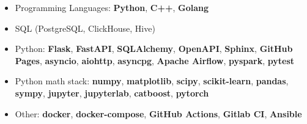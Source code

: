 


\tagline{}

\begin{fullwidth}
\makecvheader
\end{fullwidth}





\divider



\divider



\divider

\begin{itemize}
	\item Programming Languages:
    \textbf{Python}, \textbf{C++}, \textbf{Golang}
    \item SQL (PostgreSQL, ClickHouse, Hive)
    \item Python: \textbf{Flask}, \textbf{FastAPI}, \textbf{SQLAlchemy}, \textbf{OpenAPI}, \textbf{Sphinx}, \textbf{GitHub Pages}, \textbf{asyncio}, \textbf{aiohttp}, \textbf{asyncpg}, \textbf{Apache Airflow}, \textbf{pyspark}, \textbf{pytest}
    \item Python math stack: \textbf{numpy}, \textbf{matplotlib}, \textbf{scipy}, \textbf{scikit-learn}, \textbf{pandas}, \textbf{sympy}, \textbf{jupyter}, \textbf{jupyterlab}, \textbf{catboost}, \textbf{pytorch}
    \item Other: \textbf{docker}, \textbf{docker-compose}, \textbf{GitHub Actions}, \textbf{Gitlab CI}, \textbf{Ansible}
\end{itemize}

